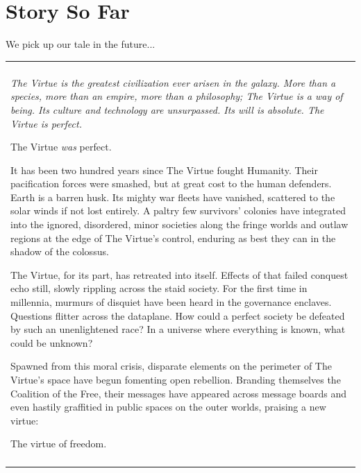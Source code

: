\makeatletter\@openrightfalse
\chapter{Story So Far}
\@openrighttrue\makeatother

We pick up our tale in the future...

\bigskip
\begin{center}  
\begin{tabular}{L{6in}}
  \hline\\
  {\it
  The Virtue is the greatest civilization ever arisen in the galaxy.
  More than a species, more than an empire, more than a philosophy; The
  Virtue is a way of being.  Its culture and technology
  are unsurpassed.  Its will is absolute.  The Virtue is perfect.

  \bigskip
  The Virtue \emph{was} perfect.

  \bigskip
  It has been two hundred years since The Virtue fought Humanity.  Their
  pacification forces were smashed, but at great cost to the human
  defenders.  Earth is a barren husk.  Its mighty war fleets have
  vanished, scattered to the solar winds if not lost entirely.  A paltry
  few survivors' colonies have integrated into the ignored, disordered, minor
  societies along the fringe worlds and outlaw regions at the edge of The Virtue's control,
  enduring as best they can
  in the shadow of the colossus.

  \smallskip
  The Virtue, for its part, has retreated into itself.  Effects of that
  failed conquest echo still, slowly rippling across the staid society.
  For the first time in millennia, murmurs of disquiet have been heard
  in the governance enclaves.  Questions flitter across the dataplane.
  How could a perfect society be defeated by such an unenlightened race?
  In a universe where everything is known, what could be unknown?

  \smallskip
  Spawned from this moral crisis, disparate elements on the perimeter of
  The Virtue's space have begun fomenting open rebellion.  Branding themselves
  the Coalition of the Free, their messages have appeared across
  message boards and even hastily graffitied in public spaces on the
  outer worlds, praising a new virtue:

  \bigskip
  \centerline{The virtue of freedom.}
  }
  \\
  \hline\\
\end{tabular}
\end{center}

